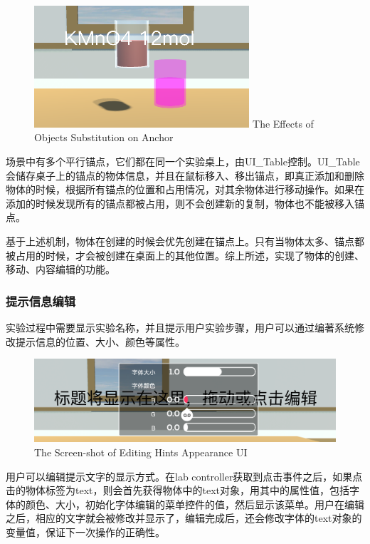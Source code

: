 \begin{figure}[!htp]
  \centering
  \includegraphics[width=8cm]{figure/substi.png}
    {The Effects of Objects Substitution on Anchor}
 \label{fig:substi}
\end{figure}

场景中有多个平行锚点，它们都在同一个实验桌上，由UI\_Table控制。UI\_Table会储存桌子上的锚点的物体信息，并且在鼠标移入、移出锚点，即真正添加和删除物体的时候，根据所有锚点的位置和占用情况，对其余物体进行移动操作。如果在添加的时候发现所有的锚点都被占用，则不会创建新的复制，物体也不能被移入锚点。

基于上述机制，物体在创建的时候会优先创建在锚点上。只有当物体太多、锚点都被占用的时候，才会被创建在桌面上的其他位置。综上所述，实现了物体的创建、移动、内容编辑的功能。


\subsubsection{提示信息编辑}
实验过程中需要显示实验名称，并且提示用户实验步骤，用户可以通过编著系统修改提示信息的位置、大小、颜色等属性。

\begin{figure}[!htp]
  \centering
  \includegraphics[width=12cm]{figure/text.png}
    {The Screen-shot of Editing Hints Appearance UI}
 \label{fig:gm}
\end{figure}

用户可以编辑提示文字的显示方式。在lab controller获取到点击事件之后，如果点击的物体标签为text，则会首先获得物体中的text对象，用其中的属性值，包括字体的颜色、大小，初始化字体编辑的菜单控件的值，然后显示该菜单。用户在编辑之后，相应的文字就会被修改并显示了，编辑完成后，还会修改字体的text对象的变量值，保证下一次操作的正确性。

